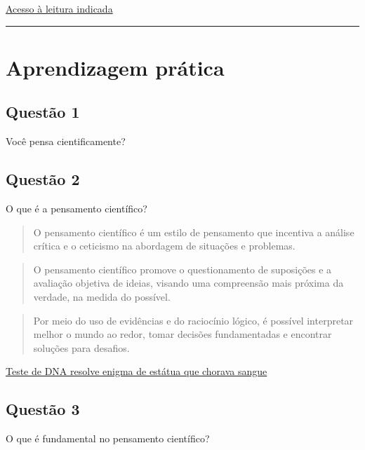 \documentclass[
  letterpaper,
  DIV=11,
  numbers=noendperiod]{scrreprt}
\begin{document}
\href{https://ivoryembassy.com/scientific-mindset/}{Acesso à leitura
indicada}

\begin{center}\rule{0.5\linewidth}{0.5pt}\end{center}

\section{Aprendizagem prática}\label{aprendizagem-pruxe1tica-1}

\subsection{Questão 1}\label{questuxe3o-1-1}

Você pensa cientificamente?

\subsection{Questão 2}\label{questuxe3o-2}

O que é a pensamento científico?

\begin{quote}
O pensamento científico é um estilo de pensamento que incentiva a
análise crítica e o ceticismo na abordagem de situações e problemas.
\end{quote}

\begin{quote}
O pensamento científico promove o questionamento de suposições e a
avaliação objetiva de ideias, visando uma compreensão mais próxima da
verdade, na medida do possível.
\end{quote}

\begin{quote}
Por meio do uso de evidências e do raciocínio lógico, é possível
interpretar melhor o mundo ao redor, tomar decisões fundamentadas e
encontrar soluções para desafios.
\end{quote}

\href{https://www.dw.com/pt-br/teste-de-dna-resolve-enigma-de-virgem-maria-que-chorava-sangue/a-71703557}{Teste
de DNA resolve enigma de estátua que chorava sangue}

\subsection{Questão 3}\label{questuxe3o-3}

O que é fundamental no pensamento científico?
\end{document}
